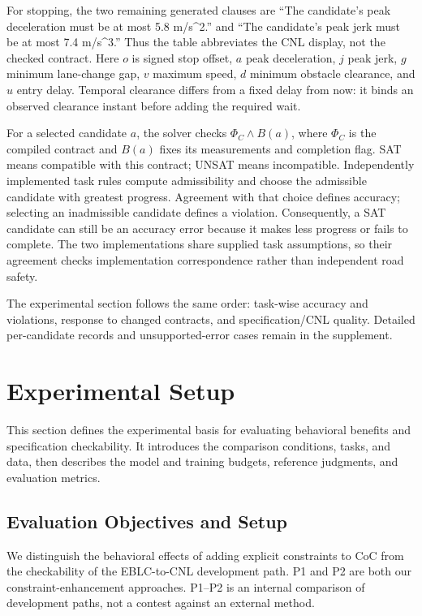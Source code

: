 \documentclass[nolineno]{ieeeaccess}
\begin{document}
For stopping, the two remaining generated clauses are “The candidate's peak deceleration must be at most 5.8 m/s\textasciicircum{}2.” and “The candidate's peak jerk must be at most 7.4 m/s\textasciicircum{}3.” Thus the table abbreviates the CNL display, not the checked contract. Here $o$ is signed stop offset, $a$ peak deceleration, $j$ peak jerk, $g$ minimum lane-change gap, $v$ maximum speed, $d$ minimum obstacle clearance, and $u$ entry delay. Temporal clearance differs from a fixed delay from now: it binds an observed clearance instant before adding the required wait.\par

For a selected candidate $a$, the solver checks $\Phi_C\land B(a)$, where $\Phi_C$ is the compiled contract and $B(a)$ fixes its measurements and completion flag. SAT means compatible with this contract; UNSAT means incompatible. Independently implemented task rules compute admissibility and choose the admissible candidate with greatest progress. Agreement with that choice defines accuracy; selecting an inadmissible candidate defines a violation. Consequently, a SAT candidate can still be an accuracy error because it makes less progress or fails to complete. The two implementations share supplied task assumptions, so their agreement checks implementation correspondence rather than independent road safety.\par

The experimental section follows the same order: task-wise accuracy and violations, response to changed contracts, and specification/CNL quality. Detailed per-candidate records and unsupported-error cases remain in the supplement.\par
\section{Experimental Setup}

This section defines the experimental basis for evaluating behavioral benefits and specification checkability. It introduces the comparison conditions, tasks, and data, then describes the model and training budgets, reference judgments, and evaluation metrics.\par

\subsection{Evaluation Objectives and Setup}

We distinguish the behavioral effects of adding explicit constraints to CoC from the checkability of the EBLC-to-CNL development path. P1 and P2 are both our constraint-enhancement approaches. P1--P2 is an internal comparison of development paths, not a contest against an external method.\par
\end{document}
